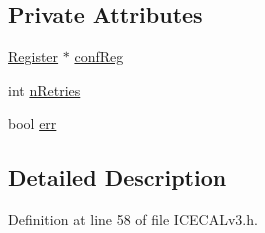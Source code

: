 \subsection*{Private Attributes}
\begin{DoxyCompactItemize}
\item 
\hyperlink{classRegister}{Register} $\ast$ \hyperlink{classICECALv3_a6e8b6c03f5b0f1d8281bf8a0fa46064f}{confReg}
\item 
int \hyperlink{classICECALv3_ae877ce34b3a4d6c368cc6409ac9614fa}{nRetries}
\item 
bool \hyperlink{classICECALv3_ad8989925ee5b3ff322d863ce6aaff0bd}{err}
\end{DoxyCompactItemize}


\subsection{Detailed Description}


Definition at line 58 of file ICECALv3.h.

